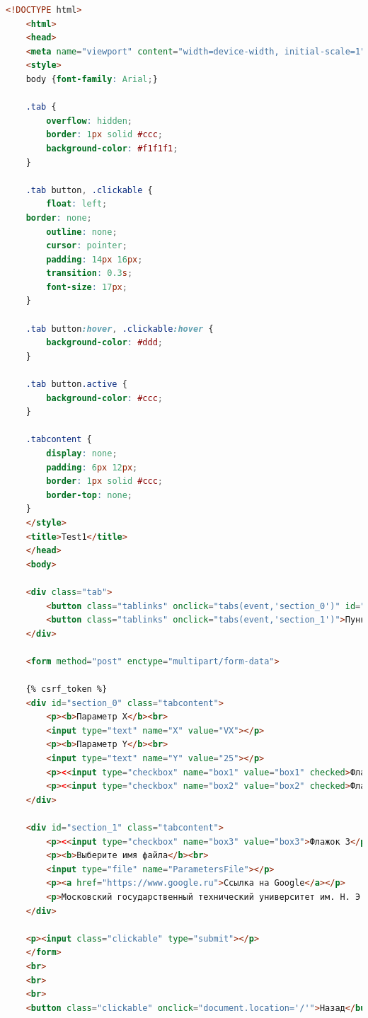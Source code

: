 \begin{lstlisting}[frame=single, label={rndhpcgui.2023.05.04.input1_html}, caption={Главное меню}, language={HTML}] 
    <!DOCTYPE html>
    <html>
    <head>
    <meta name="viewport" content="width=device-width, initial-scale=1">
    <style>
    body {font-family: Arial;}
    
    .tab {
        overflow: hidden;
        border: 1px solid #ccc;
        background-color: #f1f1f1;
    }
    
    .tab button, .clickable {
        float: left;
    border: none;
        outline: none;
        cursor: pointer;
        padding: 14px 16px;
        transition: 0.3s;
        font-size: 17px;
    }
    
    .tab button:hover, .clickable:hover {
        background-color: #ddd;
    }
    
    .tab button.active {
        background-color: #ccc;
    }
    
    .tabcontent {
        display: none;
        padding: 6px 12px;
        border: 1px solid #ccc;
        border-top: none;
    }
    </style>
    <title>Test1</title>
    </head>
    <body>
     
    <div class="tab">
        <button class="tablinks" onclick="tabs(event,'section_0')" id="defaultOpen">Пункт 1</button>
        <button class="tablinks" onclick="tabs(event,'section_1')">Пункт 2</button>
    </div>
    
    <form method="post" enctype="multipart/form-data">
    
    {% csrf_token %}
    <div id="section_0" class="tabcontent">
        <p><b>Параметр X</b><br>
        <input type="text" name="X" value="VX"></p>
        <p><b>Параметр Y</b><br>
        <input type="text" name="Y" value="25"></p>
        <p><<input type="checkbox" name="box1" value="box1" checked>Флажок 1</p>
        <p><<input type="checkbox" name="box2" value="box2" checked>Флажок 2</p>
    </div>
    
    <div id="section_1" class="tabcontent">
        <p><<input type="checkbox" name="box3" value="box3">Флажок 3</p>
        <p><b>Выберите имя файла</b><br>
        <input type="file" name="ParametersFile"></p>
        <p><a href="https://www.google.ru">Ссылка на Google</a></p>
        <p>Московский государственный технический университет им. Н. Э. Баумана - российский национальный исследовательский университет, научный центр, особо ценный объект культурного наследия народов России.</p>
    </div>
    
    <p><input class="clickable" type="submit"></p>
    </form>
    <br>
    <br>
    <br>
    <button class="clickable" onclick="document.location='/'">Назад</button>
    

\end{lstlisting}
